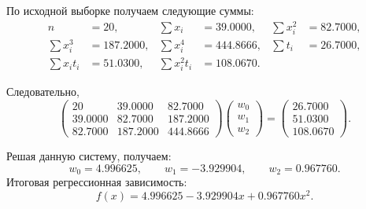 \documentclass[12pt,a4paper]{article}
\begin{document}
По исходной выборке получаем следующие суммы:
\[
\begin{aligned}
    n &= 20, &
    \sum x_i &= 39.0000, &
    \sum x_i^2 &= 82.7000,\\
    \sum x_i^3 &= 187.2000, &
    \sum x_i^4 &= 444.8666, &
    \sum t_i &= 26.7000,\\
    \sum x_it_i &= 51.0300, &
    \sum x_i^2t_i &= 108.0670. &
\end{aligned}
\]

Следовательно,
\[
\begin{pmatrix}
20 & 39.0000 & 82.7000\\
39.0000 & 82.7000 & 187.2000\\
82.7000 & 187.2000 & 444.8666
\end{pmatrix}
\begin{pmatrix}
w_0\\
w_1\\
w_2
\end{pmatrix}
=
\begin{pmatrix}
26.7000\\
51.0300\\
108.0670
\end{pmatrix}.
\]

Решая данную систему, получаем:
\[
\boxed{
    w_0=4.996625,\qquad
    w_1=-3.929904,\qquad
    w_2=0.967760
}.
\]
Итоговая регрессионная зависимость:
\[
\boxed{
    f(x)=4.996625-3.929904x+0.967760x^2
}.
\]
\end{document}
